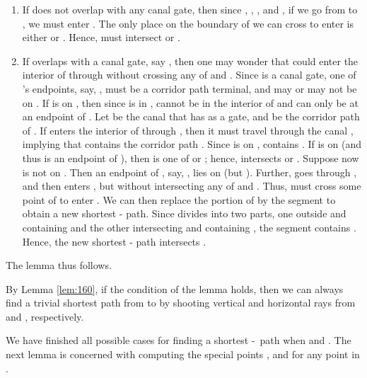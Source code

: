 \documentclass[english,runningheads,11pt]{llncs}
\def\st{-}
\newenvironment{proof}{\noindent {\textbf{Proof:}}\rm}{\hfill \rm}
\begin{document}
\begin{proof}
\begin{enumerate}
\item
If  does not overlap with any canal gate, then
since , , , and , if we go
from  to , we must enter .  The only place on the boundary of  we can cross to
enter  is either  or
. Hence,  must intersect  or
.


\item
If  overlaps with a canal gate, say , then one may wonder
that  could enter the interior of  through  without
crossing any of  and .
Since  is a canal gate, one of 's endpoints, say, , must be a corridor path
terminal, and  may or may not be on .
If  is on , then since  is in ,
 cannot be in the interior of  and can only be at an endpoint
of . Let  be the canal that has  as a
gate, and  be the corridor path of . If 
enters the interior of  through , then it must travel through the canal ,
implying that  contains the corridor path .
Since  is on ,  contains .
If  is on  (and thus is an endpoint of ),
then  is one of  or ; hence,  intersects  or
.
Suppose now  is not on .  Then an endpoint of ,
say, , lies on  (but ). Further,  goes through , and then
enters , but without intersecting any of 
and .  Thus,  must cross some point  of 
to enter .  We can then replace the portion  of  by the segment
 to obtain a new shortest - path.
Since  divides  into two parts, one outside  and
containing  and the other intersecting  and containing , the segment
 contains .  Hence, the new shortest - path
intersects .


\end{enumerate}

The lemma thus follows.
\end{proof}

By Lemma \ref{lem:160}, if the condition of the lemma
holds, then we can always find a trivial shortest path from  to
 by shooting vertical and horizontal rays from  and , respectively.


We have finished all possible cases for finding a shortest \st\ path
when  and .
The next lemma is concerned with computing the special
points , and  for any point  in .
\end{document}
